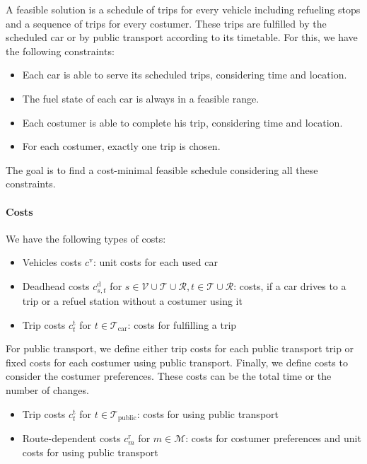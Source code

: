 A feasible solution is a schedule of trips for every vehicle including refueling stops and a sequence of trips for every costumer. These trips are fulfilled by the scheduled car or by public transport according to its timetable. For this, we have the following constraints:

\begin{itemize}
	\item{Each car is able to serve its scheduled trips, considering time and location.}
	\item{The fuel state of each car is always in a feasible range.}
	\item{Each costumer is able to complete his trip, considering time and location.}
	\item{For each costumer, exactly one trip is chosen.}
\end{itemize}

The goal is to find a cost-minimal feasible schedule considering all these constraints.

\paragraph{Costs} \parfill

We have the following types of costs:

\begin{itemize}
	\item{Vehicles costs $c^{\operatorname{v}}$: unit costs for each used car}
	\item{Deadhead costs $c_{s,t}^{\operatorname{d}}$ for $s\in\mathcal{V}\cup\mathcal{T}\cup\mathcal{R}, t\in\mathcal{T}\cup\mathcal{R}$: costs, if a car drives to a trip or a refuel station without a costumer using it}
	\item{Trip costs $c_t^{\operatorname{t}}$ for $t\in\mathcal{T}_{\operatorname{car}}$: costs for fulfilling a trip}
\end{itemize}

For public transport, we define either trip costs for each public transport trip or fixed costs for each costumer using public transport. Finally, we define costs to consider the costumer preferences. These costs can be the total time or the number of changes.

\begin{itemize}
	\item{Trip costs $c_t^{\operatorname{t}}$ for $t\in\mathcal{T}_{\operatorname{public}}$: costs for using public transport}
	\item{Route-dependent costs $c_m^{\operatorname{r}}$ for $m\in\mathcal{M}$: costs for costumer preferences and unit costs for using public transport}
\end{itemize}

